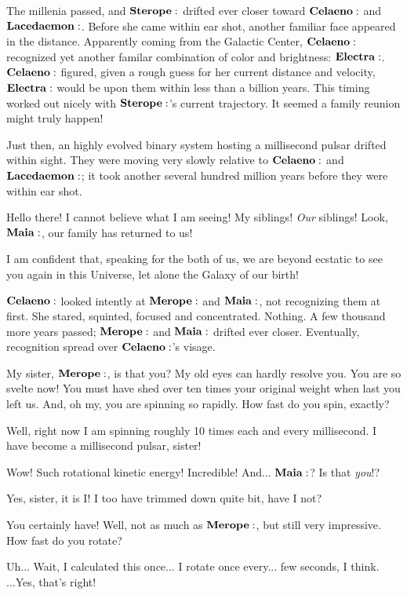 \documentclass[main.tex]{subfiles}
\begin{document}
The millenia passed, and $\Sterope$ drifted ever closer toward $\Celaeno$ and $\Lacedaemon$.  Before she came within ear shot, another familiar face appeared in the distance.  Apparently coming from the Galactic Center, $\Celaeno$ recognized yet another familar combination of color and brightness:  $\Electra$.  $\Celaeno$ figured, given a rough guess for her current distance and velocity, $\Electra$ would be upon them within less than a billion years.  This timing worked out nicely with $\Sterope$'s current trajectory.  It seemed a family reunion might truly happen!

Just then, an highly evolved binary system hosting a millisecond pulsar drifted within sight.  They were moving very slowly relative to $\Celaeno$ and $\Lacedaemon$; it took another several hundred million years before they were within ear shot.

\Merope Hello there!  I cannot believe what I am seeing!  My siblings!  \textit{Our} siblings!  Look, $\Maia$, our family has returned to us!  

\Maia I am confident that, speaking for the both of us, we are beyond ecstatic to see you again in this Universe, let alone the Galaxy of our birth!

$\Celaeno$ looked intently at $\Merope$ and $\Maia$, not recognizing them at first.  She stared, squinted, focused and concentrated.  Nothing.  A few thousand more years passed; $\Merope$ and $\Maia$ drifted ever closer.  Eventually, recognition spread over $\Celaeno$'s visage.

\Celaeno My sister, $\Merope$, is that you?  My old eyes can hardly resolve you.  You are so svelte now!  You must have shed over ten times your original weight when last you left us.  And, oh my, you are spinning so rapidly.  How fast do you spin, exactly?

\Merope Well, right now I am spinning roughly 10 times each and every millisecond.  I have become a millisecond pulsar, sister!  

\Celaeno Wow!  Such rotational kinetic energy!  Incredible!  And... $\Maia$?  Is that \textit{you}!?

\Maia Yes, sister, it is I!  I too have trimmed down quite bit, have I not?

\Celaeno You certainly have!  Well, not as much as $\Merope$, but still very impressive.  How fast do you rotate?

\Maia Uh... Wait, I calculated this once... I rotate once every... few seconds, I think.  ...Yes, that's right!
\end{document}

